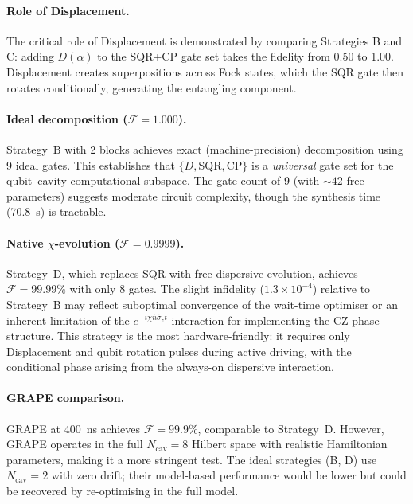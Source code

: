 \documentclass[aps,pra,twocolumn,reprint,floatfix,amsmath,amssymb]{revtex4-2}
\begin{document}
\paragraph{Role of Displacement.}
The critical role of Displacement is demonstrated by comparing
Strategies B and C: adding $D(\alpha)$ to the SQR+CP gate set
takes the fidelity from 0.50 to 1.00.  Displacement creates
superpositions across Fock states, which the SQR gate then
rotates conditionally, generating the entangling component.

\paragraph{Ideal decomposition ($\mathcal{F}=1.000$).}
Strategy~B with 2 blocks achieves exact (machine-precision)
decomposition using 9 ideal gates.  This establishes that
$\{D, \mathrm{SQR}, \mathrm{CP}\}$ is a
\emph{universal} gate set for the qubit--cavity computational
subspace.  The gate count of 9 (with $\sim42$ free parameters)
suggests moderate circuit complexity, though the synthesis time
(\SI{70.8}{s}) is tractable.

\paragraph{Native $\chi$-evolution ($\mathcal{F}=0.9999$).}
Strategy~D, which replaces SQR with free dispersive evolution,
achieves $\mathcal{F}=99.99\%$ with only 8 gates.  The slight
infidelity ($1.3\times10^{-4}$) relative to Strategy~B may
reflect suboptimal convergence of the wait-time optimiser or
an inherent limitation of the $e^{-i\chi\hat{n}\hat{\sigma}_z t}$
interaction for implementing the CZ phase structure.
This strategy is the most hardware-friendly: it requires only
Displacement and qubit rotation pulses during active driving,
with the conditional phase arising from the always-on dispersive
interaction.

\paragraph{GRAPE comparison.}
GRAPE at \SI{400}{ns} achieves $\mathcal{F}=99.9\%$, comparable
to Strategy~D.  However, GRAPE operates in the full
$N_\mathrm{cav}=8$ Hilbert space with realistic Hamiltonian
parameters, making it a more stringent test.  The ideal strategies
(B, D) use $N_\mathrm{cav}=2$ with zero drift; their model-based
performance would be lower but could be recovered by re-optimising
in the full model.
\end{document}
